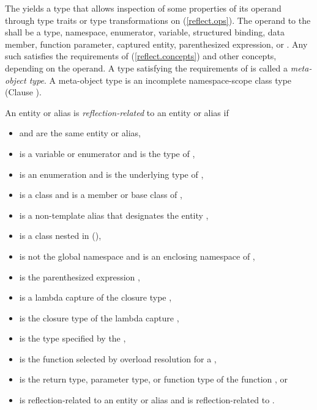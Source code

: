 \begin{std.txt}\color{addclr}

    \pnum
    The  yields a type  that allows
    inspection of some properties of its operand through type traits or type
    transformations on  (\ref{reflect.ops}).  The operand to the
     shall be a type, namespace, enumerator,
    variable, structured binding, data member, function parameter, captured
    entity, parenthesized expression,  or
    .  Any such  satisfies the requirements of
     (\ref{reflect.concepts}) and other 
    concepts, depending on the operand.  A type satisfying the requirements of
     is called a \emph{meta-object type}.  A meta-object
    type is an incomplete namespace-scope class type (Clause ).

    \pnum
    An entity or alias  is \emph{reflection-related} to an entity or
    alias  if

    \begin{itemize}
      \item {} and  are the same entity or alias,
      \item {} is a variable or enumerator and  is the type of ,
      \item {} is an enumeration and  is the underlying type of ,
      \item {} is a class and  is a member or base class of ,
      \item {} is a non-template alias that designates the entity ,
      \item {} is a class nested in  (),
      \item {} is not the global namespace and  is an enclosing namespace of ,
      \item {} is the parenthesized expression ,
      \item {} is a lambda capture of the closure type ,
      \item {} is the closure type of the lambda capture ,
      \item {} is the type specified by the  ,
      \item {} is the function selected by overload resolution for a  ,
      \item {} is the return type, parameter type, or function type of the function , or
      \item {} is reflection-related to an entity or alias  and  is reflection-related to .
    \end{itemize}


\end{std.txt}
